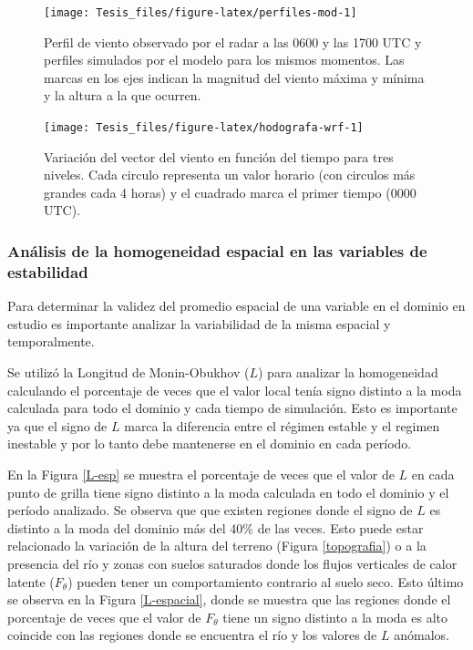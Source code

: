 \documentclass[12pt,spanish,oneside]{book}
\begin{document}
\begin{figure}

{\centering \texttt{[image: Tesis\_files/figure-latex/perfiles-mod-1]} 

}

\caption{Perfil de viento observado por el radar a las 0600 y las 1700 UTC y perfiles simulados por el modelo para los mismos momentos. Las marcas en los ejes indican la magnitud del viento máxima y mínima y la altura a la que ocurren. \label{perfiles-modelo}}\label{fig:perfiles-mod}
\end{figure}

\begin{figure}

{\centering \texttt{[image: Tesis\_files/figure-latex/hodografa-wrf-1]} 

}

\caption{Variación del vector del viento en función del tiempo para tres niveles. Cada circulo representa un valor horario (con circulos más grandes cada 4 horas) y el cuadrado marca el primer tiempo (0000 UTC). \label{hodografa-wrf}}\label{fig:hodografa-wrf}
\end{figure}

\subsubsection{Análisis de la homogeneidad espacial en las variables de
estabilidad}\label{analisis-de-la-homogeneidad-espacial-en-las-variables-de-estabilidad}

Para determinar la validez del promedio espacial de una variable en el
dominio en estudio es importante analizar la variabilidad de la misma
espacial y temporalmente.

Se utilizó la Longitud de Monin-Obukhov (\(L\)) para analizar la
homogeneidad calculando el porcentaje de veces que el valor local tenía
signo distinto a la moda calculada para todo el dominio y cada tiempo de
simulación. Esto es importante ya que el signo de \(L\) marca la
diferencia entre el régimen estable y el regimen inestable y por lo
tanto debe mantenerse en el dominio en cada período.

En la Figura \ref{L-esp} se muestra el porcentaje de veces que el valor
de \(L\) en cada punto de grilla tiene signo distinto a la moda
calculada en todo el dominio y el período analizado. Se observa que que
existen regiones donde el signo de \(L\) es distinto a la moda del
dominio más del 40\% de las veces. Esto puede estar relacionado la
variación de la altura del terreno (Figura \ref{topografia}) o a la
presencia del río y zonas con suelos saturados donde los flujos
verticales de calor latente (\(F_{\theta}\)) pueden tener un
comportamiento contrario al suelo seco. Esto último se observa en la
Figura \ref{L-espacial}, donde se muestra que las regiones donde el
porcentaje de veces que el valor de \(F_{\theta}\) tiene un signo
distinto a la moda es alto coincide con las regiones donde se encuentra
el río y los valores de \(L\) anómalos.
\end{document}
